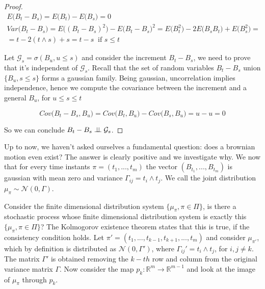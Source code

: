\begin{proof}
    \begin{gather*}
        E\big(B_t-B_s\big) = E\big( B_t \big) - E\big( B_s \big) = 0 \\
        Var\big( B_t - B_s \big) = E\big( (B_t-B_s)^2 \big) - E\big(B_t-B_s\big)^2 = E\big( B_t^2) -2 E\big( B_s B_t \big) + E \big( B_s^2 \big) = \\
        = t-2( t \wedge s )+s = t-s \;\; \text{if $s \leq t$}
    \end{gather*}

    Let $\mathcal{G}_s = \sigma(B_u, u\leq s)$ and consider the increment $B_t - B_s$, we need to prove that it's independent of $\mathcal{G}_s$. Recall that the set of random variables $B_t-B_s$ union $\{ B_u, s \leq s\}$ forms a gaussian family. Being gaussian, uncorrelation implies independence, hence we compute the covariance between the increment and a general $B_u$, for $u \leq s \leq t$

    \begin{equation*}
        Cov\big(B_t - B_s, B_u\big) = Cov\big(B_t,B_u\big) - Cov\big(B_s,B_u\big) = u - u = 0
    \end{equation*}

    So we can conclude $B_t-B_s \perp \!\!\! \perp \mathcal{G}_s$.
\end{proof}

Up to now, we haven't asked ourselves a fundamental question: does a brownian motion even exist? The answer is clearly positive and we investigate why. We now that for every time instants $\pi = (t_1,...,t_m)$ the vector $(B_{t_1},...,B_{t_m})$ is gaussian with mean zero and variance $\Gamma_{ij} = t_i \wedge t_j$. We call the joint distribution $\mu_{\pi} \sim \mathcal{N}(0,\Gamma)$. 

Consider the finite dimensional distribution system $\{ \mu_{\pi}, \pi \in \Pi \}$, is there a stochastic process whose finite dimensional distribution system is exactly this $\{ \mu_{\pi}, \pi \in \Pi \}$? The Kolmogorov existence theorem states that this is true, if the consistency condition holds. Let $\pi' = (t_1,...,t_{k-1},t_{k+1},...,t_m)$ and consider $\mu_{\pi'}$, which by definition is distributed as $\mathcal{N}(0,\Gamma')$, where $\Gamma_{ij}' = t_i \wedge t_j$, for $i,j \neq k$. The matrix $\Gamma'$ is obtained removing the $k-th$ row and column from the original variance matrix $\Gamma$. Now consider the map $p_k : \mathbb{R}^{m} \to \mathbb{R}^{m-1}$ and look at the image of $\mu_{\pi}$ through $p_k$. 


